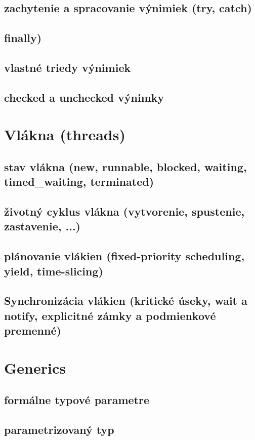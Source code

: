 \subsection*{zachytenie a spracovanie výnimiek (try, catch)}
\subsection*{finally)}
\subsection*{vlastné triedy výnimiek}
\subsection*{checked a unchecked výnimky}

\section{Vlákna (threads)}
\subsection*{stav vlákna (new, runnable, blocked, waiting, timed\_waiting, terminated)}
\subsection*{životný cyklus vlákna (vytvorenie, spustenie, zastavenie, ...)}
\subsection*{plánovanie vlákien (fixed-priority scheduling, yield, time-slicing)}
\subsection*{Synchronizácia vlákien (kritické úseky, wait a notify, explicitné zámky a podmienkové premenné)}

\section{Generics}
\subsection*{formálne typové parametre}
\subsection*{parametrizovaný typ}
